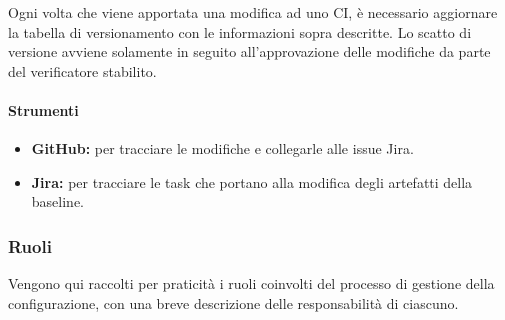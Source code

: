 \documentclass[a4paper,12pt]{article}
\begin{document}
Ogni volta che viene apportata una modifica ad uno CI, è necessario aggiornare
la tabella di versionamento con le informazioni sopra descritte. Lo scatto di
versione avviene solamente in seguito all'approvazione delle modifiche da parte
del verificatore stabilito.

\paragraph{Strumenti}
\begin{itemize}
    \item \textbf{GitHub:} per tracciare le modifiche e collegarle alle issue Jira.
    \item \textbf{Jira:} per tracciare le task che portano alla modifica degli artefatti della baseline.
\end{itemize}

\subsubsection{Ruoli}
Vengono qui raccolti per praticità i ruoli coinvolti del processo di gestione
della configurazione, con una breve descrizione delle responsabilità di
ciascuno.
\end{document}
